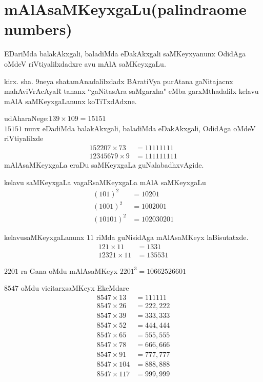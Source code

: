 \chapter{mAlAsaMKeyxgaLu{\rm (palindraome numbers)}}

EDariMda balakAkxgali, baladiMda eDakAkxgali saMKeyxyanunx OdidAga oMdeV riVtiyalilxdadxre avu mAlA saMKeyxgaLu.

kirx. sha. $9$\;neya shatamAnadalilxdadx BAratiVya purAtana gaNitajacnx mahAviVrAcAyaR tananx ``gaNitasAra saMgarxha" eMba garxMthadalilx kelavu mAlA saMKeyxgaLanunx koTiTxdAdxne.

udAharaNege:\qquad $139 \times 109 = 15151$\\
$15151$ nunx eDadiMda balakAkxgali, baladiMda eDakAkxgali, OdidAga oMdeV riVtiyalilxde
\begin{align*}
152207 \times 73 &= 11111111\\
12345679 \times 9 &= 111111111
\end{align*}
mAlAsaMKeyxgaLa eraDu saMKeyxgaLa guNalabadhxvAgide.

kelavu saMKeyxgaLa vagaRsaMKeyxgaLa mAlA saMKeyxgaLu
\begin{align*}
(101)^2 &= 10201\\
(1001)^2 &= 1002001\\
(10101)^2 &= 102030201
\end{align*}

kelavusaMKeyxgaLanunx $11$ riMda guNisidAga mAlAsaMKeyx laBisutatxde.
\begin{align*}
121 \times 11 &=1331 \\
12321 \times 11 &= 135531
\end{align*}

$2201$ ra Gana oMdu mAlAsaMKeyx $2201^3 =10662526601$

$8547$ oMdu vicitarxsaMKeyx EkeMdare
\begin{align*}
8547 \times 13 &= 111111\\
8547 \times 26  &= 222,222 \\
8547 \times 39  &= 333,333 \\
8547 \times 52  &= 444,444 \\
8547 \times 65  &= 555,555 \\
8547 \times 78  &= 666,666 \\
8547 \times 91  &= 777,777 \\
8547 \times 104 &= 888,888 \\
8547 \times 117 &= 999,999 \\
\end{align*}

